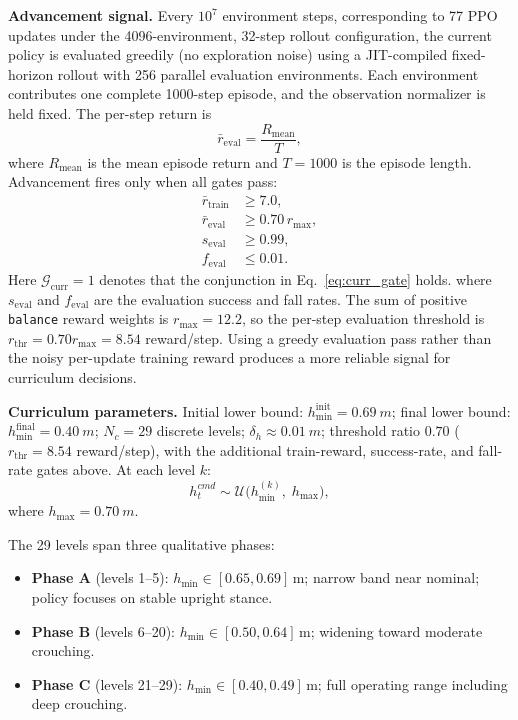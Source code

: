 \documentclass[conference]{IEEEtran}
\begin{document}
\noindent\textbf{Advancement signal.}
Every $10^7$ environment steps, corresponding to 77 PPO updates under the
4096-environment, 32-step rollout configuration, the current policy is
evaluated greedily (no exploration noise) using a JIT-compiled fixed-horizon
rollout with 256 parallel evaluation environments.
Each environment contributes one complete 1000-step episode, and the
observation normalizer is held fixed.
The per-step return is
\begin{equation}
\bar{r}_{\mathrm{eval}} = \frac{R_{\mathrm{mean}}}{T},
\label{eq:eval_per_step}
\end{equation}
where $R_{\mathrm{mean}}$ is the mean episode return
and $T = 1000$ is the episode length.
Advancement fires only when all gates pass:
\begin{align}
\bar{r}_{\mathrm{train}} &\geq 7.0, \nonumber\\
\bar{r}_{\mathrm{eval}} &\geq 0.70\,r_{\max}, \label{eq:curr_gate}\\
s_{\mathrm{eval}} &\geq 0.99, \nonumber\\
f_{\mathrm{eval}} &\leq 0.01. \nonumber
\end{align}
Here $\mathcal{G}_{\mathrm{curr}}=1$ denotes that the conjunction in
Eq.~\eqref{eq:curr_gate} holds.
where $s_{\mathrm{eval}}$ and $f_{\mathrm{eval}}$ are the evaluation success
and fall rates.
The sum of positive \texttt{balance} reward weights is $r_{\max}=12.2$,
so the per-step evaluation threshold is
$r_{\mathrm{thr}} = 0.70r_{\max} = 8.54$ reward/step.
Using a greedy evaluation pass rather than the noisy per-update training
reward produces a more reliable signal for curriculum decisions.

\noindent\textbf{Curriculum parameters.}
Initial lower bound: $h_{\min}^{\mathrm{init}} = \SI{0.69}{m}$;
final lower bound: $h_{\min}^{\mathrm{final}} = \SI{0.40}{m}$;
$N_c = 29$ discrete levels;
$\delta_h \approx \SI{0.01}{m}$;
threshold ratio $0.70$ ($r_{\mathrm{thr}}=8.54$ reward/step), with the
additional train-reward, success-rate, and fall-rate gates above.
At each level $k$:
\begin{equation}
h_t^{cmd} \sim \mathcal{U}\!\big(h_{\min}^{(k)},\; h_{\max}\big),
\end{equation}
where $h_{\max} = \SI{0.70}{m}$.

The 29 levels span three qualitative phases:
\begin{itemize}
    \item \textbf{Phase A} (levels 1--5):
    $h_{\min} \in [0.65, 0.69]\,\mathrm{m}$;
    narrow band near nominal; policy focuses on stable upright stance.
    \item \textbf{Phase B} (levels 6--20):
    $h_{\min} \in [0.50, 0.64]\,\mathrm{m}$;
    widening toward moderate crouching.
    \item \textbf{Phase C} (levels 21--29):
    $h_{\min} \in [0.40, 0.49]\,\mathrm{m}$;
    full operating range including deep crouching.
\end{itemize}
\end{document}

